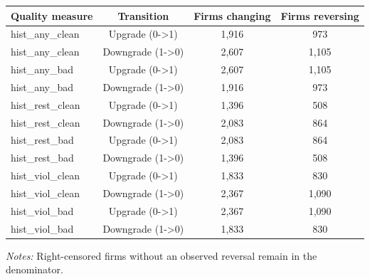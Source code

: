 \documentclass[10pt]{article}
\begin{document}
\begin{minipage}{19cm}\fontsize{10}{12}\selectfont\setlength{\tabcolsep}{4pt}\renewcommand{\arraystretch}{1.12}


\centering
{}
\begin{threeparttable}
\begin{tabular}{p{}ccc}
\toprule
Quality measure & Transition & Firms changing & Firms reversing \\
\midrule
hist\_any\_clean & Upgrade (0->1) & 1,916 & 973 \\
hist\_any\_clean & Downgrade (1->0) & 2,607 & 1,105 \\
hist\_any\_bad & Upgrade (0->1) & 2,607 & 1,105 \\
hist\_any\_bad & Downgrade (1->0) & 1,916 & 973 \\
hist\_rest\_clean & Upgrade (0->1) & 1,396 & 508 \\
hist\_rest\_clean & Downgrade (1->0) & 2,083 & 864 \\
hist\_rest\_bad & Upgrade (0->1) & 2,083 & 864 \\
hist\_rest\_bad & Downgrade (1->0) & 1,396 & 508 \\
hist\_viol\_clean & Upgrade (0->1) & 1,833 & 830 \\
hist\_viol\_clean & Downgrade (1->0) & 2,367 & 1,090 \\
hist\_viol\_bad & Upgrade (0->1) & 2,367 & 1,090 \\
hist\_viol\_bad & Downgrade (1->0) & 1,833 & 830 \\
\bottomrule
\end{tabular}
\begin{tablenotes}\fontsize{9}{11}\selectfont
\item \raggedright \fontsize{9}{11}\selectfont \textit{Notes:} Right-censored firms without an observed reversal remain in the denominator.
\end{tablenotes}
\end{threeparttable}

\end{minipage}
\end{document}
